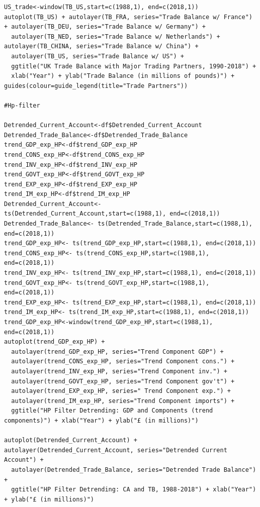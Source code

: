 \documentclass[12pt]{article}
\begin{document}
\begin{verbatim}
US_trade<-window(TB_US,start=c(1988,1), end=c(2018,1)) 
autoplot(TB_US) + autolayer(TB_FRA, series="Trade Balance w/ France") + autolayer(TB_DEU, series="Trade Balance w/ Germany") +
  autolayer(TB_NED, series="Trade Balance w/ Netherlands") + autolayer(TB_CHINA, series="Trade Balance w/ China") + 
  autolayer(TB_US, series="Trade Balance w/ US") +
  ggtitle("UK Trade Balance with Major Trading Partners, 1990-2018") + 
  xlab("Year") + ylab("Trade Balance (in millions of pounds)") + guides(colour=guide_legend(title="Trade Partners"))

#Hp-filter

Detrended_Current_Account<-df$Detrended_Current_Account
Detrended_Trade_Balance<-df$Detrended_Trade_Balance
trend_GDP_exp_HP<-df$trend_GDP_exp_HP
trend_CONS_exp_HP<-df$trend_CONS_exp_HP
trend_INV_exp_HP<-df$trend_INV_exp_HP
trend_GOVT_exp_HP<-df$trend_GOVT_exp_HP
trend_EXP_exp_HP<-df$trend_EXP_exp_HP	
trend_IM_exp_HP<-df$trend_IM_exp_HP
Detrended_Current_Account<- ts(Detrended_Current_Account,start=c(1988,1), end=c(2018,1))
Detrended_Trade_Balance<- ts(Detrended_Trade_Balance,start=c(1988,1), end=c(2018,1))
trend_GDP_exp_HP<- ts(trend_GDP_exp_HP,start=c(1988,1), end=c(2018,1))
trend_CONS_exp_HP<- ts(trend_CONS_exp_HP,start=c(1988,1), end=c(2018,1))
trend_INV_exp_HP<- ts(trend_INV_exp_HP,start=c(1988,1), end=c(2018,1))
trend_GOVT_exp_HP<- ts(trend_GOVT_exp_HP,start=c(1988,1), end=c(2018,1))
trend_EXP_exp_HP<- ts(trend_EXP_exp_HP,start=c(1988,1), end=c(2018,1))
trend_IM_exp_HP<- ts(trend_IM_exp_HP,start=c(1988,1), end=c(2018,1))
trend_GDP_exp_HP<-window(trend_GDP_exp_HP,start=c(1988,1), end=c(2018,1)) 
autoplot(trend_GDP_exp_HP) +
  autolayer(trend_GDP_exp_HP, series="Trend Component GDP") +
  autolayer(trend_CONS_exp_HP, series="Trend Component cons.") +
  autolayer(trend_INV_exp_HP, series="Trend Component inv.") +
  autolayer(trend_GOVT_exp_HP, series="Trend Component gov't") +
  autolayer(trend_EXP_exp_HP, series=" Trend Component exp.") +
  autolayer(trend_IM_exp_HP, series="Trend Component imports") +
  ggtitle("HP Filter Detrending: GDP and Components (trend components)") + xlab("Year") + ylab("£ (in millions)")

autoplot(Detrended_Current_Account) + autolayer(Detrended_Current_Account, series="Detrended Current Account") +
  autolayer(Detrended_Trade_Balance, series="Detrended Trade Balance") +
  ggtitle("HP Filter Detrending: CA and TB, 1988-2018") + xlab("Year") + ylab("£ (in millions)")


\end{verbatim}
\end{document}
